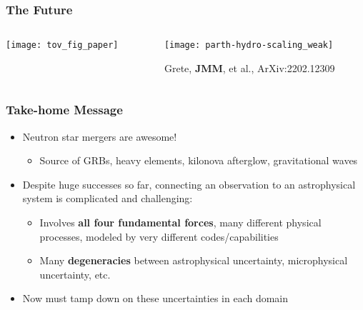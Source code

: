\documentclass[]{beamer}
\begin{document}
\begin{frame}
  \frametitle{The Future}
  \begin{columns}
    \begin{column}{6cm}
      \begin{center}
        \texttt{[image: tov\_fig\_paper]}
      \end{center}
    \end{column}
    \begin{column}{6cm}
      \begin{center}
        \texttt{[image: parth-hydro-scaling\_weak]}
      \end{center}
      {\footnotesize Grete, \textbf{JMM}, et al., ArXiv:2202.12309}
    \end{column}
  \end{columns}
\end{frame}

\begin{frame}
  \frametitle{Take-home Message}
  \begin{itemize}
  \item Neutron star mergers are awesome!
    \begin{itemize}
    \item Source of GRBs, heavy elements, kilonova afterglow,
      gravitational waves
    \end{itemize}
  \item Despite huge successes so far, connecting an observation to an
    astrophysical system is complicated and challenging:
    \begin{itemize}
    \item Involves \textbf{all four fundamental forces}, many different physical processes, modeled by very different codes/capabilities
    \item Many \textbf{degeneracies} between astrophysical uncertainty, microphysical uncertainty, etc.
    \end{itemize}
  \item Now must tamp down on these uncertainties in each domain
  \end{itemize}
\end{frame}
\end{document}
